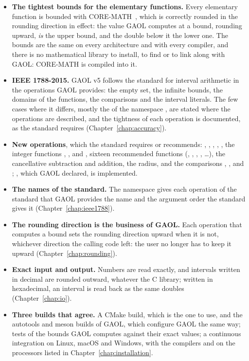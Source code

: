 \documentclass[12pt,a4paper,twoside,openright]{book}
\begin{document}
\begin{itemize}
\item[$\bullet$] \textbf{The tightest bounds for the elementary functions.}
  Every elementary function is bounded with CORE-MATH~\cite{CoreMath:2022},
  which is correctly rounded in the rounding direction in effect: the value
  GAOL computes at a bound, rounding upward, \emph{is} the upper bound, and
  the double below it the lower one. The bounds are the same on every
  architecture and with every compiler, and there is no mathematical library
  to install, to find or to link along with GAOL: CORE-MATH is compiled into
  it.
\item[$\bullet$] \textbf{IEEE 1788-2015.} GAOL v5 follows the standard for
  interval arithmetic in the operations GAOL provides: the empty set, the
  infinite bounds, the domains of the functions, the comparisons and the
  interval literals. The few cases where it differs, mostly the 
  of the namespace , are stated where the operations are
  described, and the tightness of each operation is documented, as the
  standard requires (Chapter~\ref{chap:accuracy}).
\item[$\bullet$] \textbf{New operations}, which the standard requires or
  recommends: , , , ,
  , the integer functions , ,
   and , sixteen
  recommended functions (, , ,
  , \ldots), the cancellative subtraction and
  addition, the radius, and the comparisons ,
  ,  and ;
  , which GAOL declared, is implemented.
\item[$\bullet$] \textbf{The names of the standard.} The namespace
   gives each operation of the standard that GAOL
  provides the name and the argument order the standard gives it
  (Chapter~\ref{chap:ieee1788}).
\item[$\bullet$] \textbf{The rounding direction is the business of GAOL.}
  Each operation that computes a bound sets the rounding direction upward
  when it is not, whichever direction the calling code left: the user no
  longer has to keep it upward (Chapter~\ref{chap:rounding}).
\item[$\bullet$] \textbf{Exact input and output.} Numbers are read exactly,
  and intervals written in decimal are rounded outward, whatever the C
  library; written in hexadecimal, an interval is read back as the same
  doubles (Chapter~\ref{chap:io}).
\item[$\bullet$] \textbf{Three builds that agree.} A CMake build, which is
  the one to use, and the autotools and meson builds of GAOL, which configure
  GAOL the same way; tests of the bounds GAOL computes against their exact
  values; a continuous integration on Linux, macOS and Windows, with the
  compilers and on the processors listed in Chapter~\ref{chap:installation}.
\end{itemize}
\end{document}
